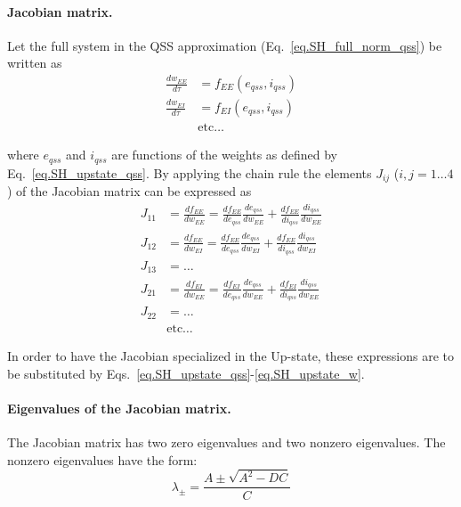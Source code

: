 \documentclass[twocolumn]{article}
\newcommand{\EE}{\mathit{EE}}
\newcommand{\EI}{\mathit{EI}}
\newcommand{\qss}{\mathit{qss}}
\begin{document}
\paragraph{Jacobian matrix.}

Let the full system in the QSS approximation (Eq.\ \ref{eq.SH_full_norm_qss}) be written as
\begin{displaymath}
\begin{aligned}
\frac{dw_{\EE}}{d\tau} & = f_{\EE}(e_{\qss},i_{\qss}) \\
\frac{dw_{\EI}}{d\tau} & = f_{\EI}(e_{\qss},i_{\qss}) \\
& \mbox{etc}\ldots
\end{aligned}
\end{displaymath}

\noindent where $e_{\qss}$ and $i_{\qss}$ are functions of the weights as defined by Eq.\ \ref{eq.SH_upstate_qss}. By applying the chain rule the elements $J_{ij}$ ($i,j=1\ldots4$) of the Jacobian matrix can be expressed as
\begin{displaymath}
\begin{aligned}
J_{11} & = \frac{df_{\EE}}{dw_{\EE}} = \frac{df_{\EE}}{de_{\qss}} \frac{de_{\qss}}{dw_{\EE}} + \frac{df_{\EE}}{di_{\qss}} \frac{di_{\qss}}{dw_{\EE}} \\
J_{12} & = \frac{df_{\EE}}{dw_{\EI}} = \frac{df_{\EE}}{de_{\qss}} \frac{de_{\qss}}{dw_{\EI}} + \frac{df_{\EE}}{di_{\qss}} \frac{di_{\qss}}{dw_{\EI}} \\
J_{13} & = \ldots \\
J_{21} & = \frac{df_{\EI}}{dw_{\EE}} = \frac{df_{\EI}}{de_{\qss}} \frac{de_{\qss}}{dw_{\EE}} + \frac{df_{\EI}}{di_{\qss}} \frac{di_{\qss}}{dw_{\EE}} \\
J_{22} & = \ldots \\
& \mbox{etc}\ldots
\end{aligned}
\end{displaymath}

In order to have the Jacobian specialized in the Up-state, these expressions are to be substituted by Eqs.\ \ref{eq.SH_upstate_qss}-\ref{eq.SH_upstate_w}.



\paragraph{Eigenvalues of the Jacobian matrix.}

The Jacobian matrix has two zero eigenvalues and two nonzero eigenvalues. The nonzero eigenvalues have the form:
\begin{equation}
\lambda_{\pm} = \frac{A \pm \sqrt{A^2 - DC}}{C}
\label{eq.SH_eigvals}
\end{equation}
\end{document}
